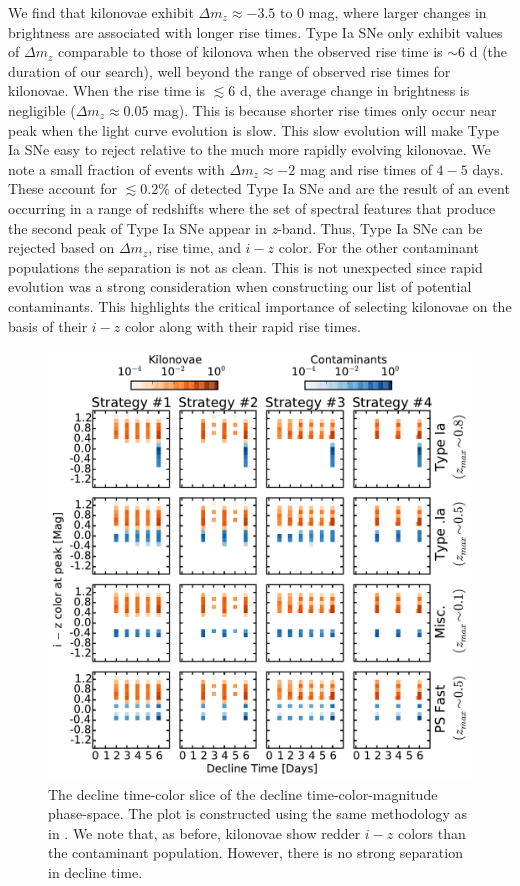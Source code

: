\clearpage
We find that kilonovae exhibit $\Delta m_z \approx -3.5\text{ to }0$ mag, where larger changes in brightness are associated with longer rise times. Type Ia SNe only exhibit values of $\Delta m_z$ comparable to those of kilonova when the observed rise time is $\sim6$ d (the duration of our search), well beyond the range of observed rise times for kilonovae. When the rise time is $\lesssim6$ d, the average change in brightness is negligible ($\Delta m_z \approx 0.05$ mag). This is because shorter rise times only occur near peak when the light curve evolution is slow. This slow evolution will make Type Ia SNe easy to reject relative to the much more rapidly evolving kilonovae. We note a small fraction of events with $\Delta m_z \approx -2$ mag and rise times of $4-5$ days. These account for $\lesssim0.2\%$ of detected Type Ia SNe and are the result of an event occurring in a range of redshifts where the set of spectral features that produce the second peak of Type Ia SNe appear in {\em z}-band. Thus, Type Ia SNe can be rejected based on $\Delta m_z$, rise time, and $i-z$ color. For the other contaminant populations the separation is not as clean. This is not unexpected since rapid evolution was a strong consideration when constructing our list of potential contaminants. This highlights the critical importance of selecting kilonovae on the basis of their $i-z$ color along with their rapid rise times.

\begin{figure}[t!]
\centering
\includegraphics[width=\textwidth]{./figs/chapter2/ch2_f10.pdf}
\caption{The decline time-color slice of the decline time-color-magnitude phase-space. The plot is constructed using the same methodology as in . We note that, as before, kilonovae show redder $i-z$ colors than the contaminant population. However, there is no strong separation in decline time.}
\label{fig:ch2_deccol}
\end{figure}

